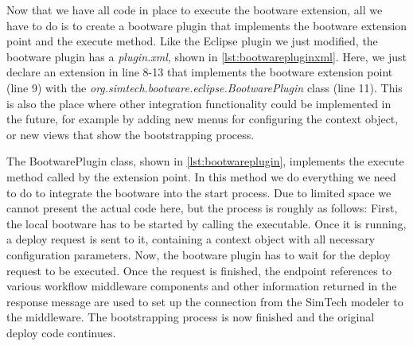 
Now that we have all code in place to execute the bootware extension, all we have to do is to create a bootware plugin that implements the bootware extension point and the execute method.
Like the Eclipse plugin we just modified, the bootware plugin has a \textit{plugin.xml}, shown in \autoref{lst:bootwarepluginxml}.
Here, we just declare an extension in line 8-13 that implements the bootware extension point (line 9) with the \textit{org.simtech.bootware.eclipse.BootwarePlugin} class (line 11).
This is also the place where other integration functionality could be implemented in the future, for example by adding new menus for configuring the context object, or new views that show the bootstrapping process.

\vspace*{\baselineskip}

The BootwarePlugin class, shown in \autoref{lst:bootwareplugin}, implements the execute method called by the extension point.
In this method we do everything we need to do to integrate the bootware into the start process.
Due to limited space we cannot present the actual code here, but the process is roughly as follows:
First, the local bootware has to be started by calling the executable.
Once it is running, a deploy request is sent to it, containing a context object with all necessary configuration parameters.
Now, the bootware plugin has to wait for the deploy request to be executed.
Once the request is finished, the endpoint references to various workflow middleware components and other information returned in the response message are used to set up the connection from the SimTech modeler to the middleware.
The bootstrapping process is now finished and the original deploy code continues.

\vspace*{\baselineskip}
